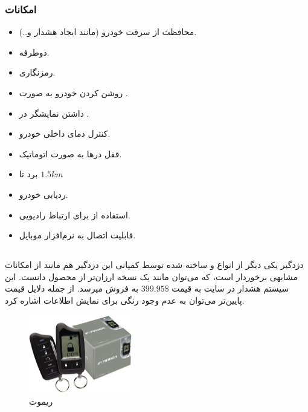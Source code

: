 \documentclass[a4paper,12pt]{report}
\begin{document}
	\subsubsection{
		امکانات
	}\label{subsubsec1:subsec1:sec3:chap1}
	\begin{itemize}[nosep]\label{item1:subsec1:sec3:chap1}
		\item
			محافظت از سرقت خودرو (مانند ایجاد هشدار و..).
		\item
			 دوطرفه.
		\item
			رمزنگاری.
		\item
			روشن کردن خودرو به صورت
			.
		\item
			داشتن نمایشگر
			در
			.
		\item
			کنترل دمای داخلی خودرو.
		\item
			قفل درها به صورت اتوماتیک.
		\item
			برد
				تا
			$1.5 km$
		\item
			ردیابی خودرو.
		\item
			استفاده از
			برای ارتباط رادیویی.
		\item
			قابلیت اتصال به نرم‌افزار موبایل.
	\end{itemize}

	\subsection{
	}\label{subsec2:sec3:chap1}

	دزدگیر
	یکی دیگر از انواع
	و  ساخته شده توسط کمپانی
	این دزدگیر هم مانند
	از امکانات مشابهی برخوردار است، که می‌توان مانند یک نسخه ارزان‌تر از محصول
	دانست. این سیستم هشدار در سایت
		به قیمت
	$399.95\$$
	به فروش میرسد. از جمله دلایل قیمت پایین‌تر می‌توان به عدم وجود
	رنگی برای نمایش اطلاعات اشاره کرد.
	\cite{pythonHo3:online}

	\begin{figure}[!h]
		\begin{center}
			\includegraphics[width=0.4\textwidth]{images/Python_5760P.jpg}
			\caption{
			ریموت
			}
			\label{fig1:subsec2:sec3:chap1}
		\end{center}
	\end{figure}
\end{document}
